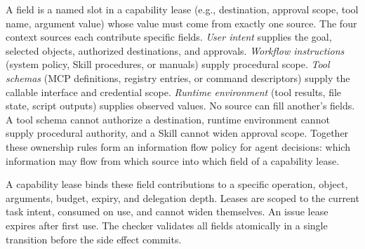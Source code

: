 \documentclass[sigconf,nonacm]{acmart}
\begin{document}
A field is a named slot in a capability lease (e.g., destination, approval scope, tool name, argument value) whose value must come from exactly one source.
The four context sources each contribute specific fields.
\emph{User intent} supplies the goal, selected objects, authorized destinations, and approvals.
\emph{Workflow instructions} (system policy, Skill procedures, or manuals) supply procedural scope.
\emph{Tool schemas} (MCP definitions, registry entries, or command descriptors) supply the callable interface and credential scope.
\emph{Runtime environment} (tool results, file state, script outputs) supplies observed values.
No source can fill another's fields.
A tool schema cannot authorize a destination, runtime environment cannot supply procedural authority, and a Skill cannot widen approval scope.
Together these ownership rules form an information flow policy for agent decisions: which information may flow from which source into which field of a capability lease.

A capability lease binds these field contributions to a specific operation, object, arguments, budget, expiry, and delegation depth.
Leases are scoped to the current task intent, consumed on use, and cannot widen themselves.
An issue lease expires after first use.
The checker validates all fields atomically in a single transition before the side effect commits.
\end{document}
